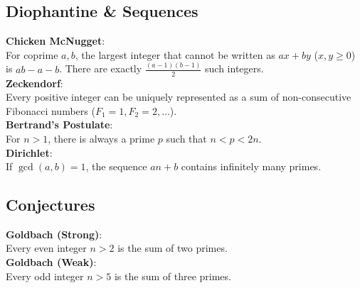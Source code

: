 \subsection{Diophantine \& Sequences}
	\textbf{Chicken McNugget}: \\ For coprime $a, b$, the largest integer that cannot be written as $ax+by$ ($x,y \ge 0$) is $ab - a - b$. There are exactly $\frac{(a-1)(b-1)}{2}$ such integers. \\
	\textbf{Zeckendorf}: \\ Every positive integer can be uniquely represented as a sum of non-consecutive Fibonacci numbers ($F_1=1, F_2=2, \dots$). \\
	\textbf{Bertrand's Postulate}: \\ For $n > 1$, there is always a prime $p$ such that $n < p < 2n$. \\
	\textbf{Dirichlet}: \\ If $\gcd(a, b)=1$, the sequence $an+b$ contains infinitely many primes. \\
\subsection{Conjectures}
	\textbf{Goldbach (Strong)}: \\ Every even integer $n > 2$ is the sum of two primes. \\
	\textbf{Goldbach (Weak)}: \\ Every odd integer $n > 5$ is the sum of three primes. \\